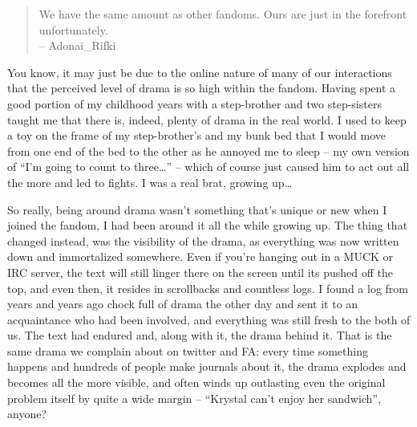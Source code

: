 \begin{quote}
We have the same amount as other fandoms. Ours are just in the forefront unfortunately.\\
-- Adonai\_Rifki
\end{quote}

You know, it may just be due to the online nature of many of our interactions that the perceived level of drama is so high within the fandom. Having spent a good portion of my childhood years with a step-brother and two step-sisters taught me that there is, indeed, plenty of drama in the real world. I used to keep a toy on the frame of my step-brother's and my bunk bed that I would move from one end of the bed to the other as he annoyed me to sleep -- my own version of ``I'm going to count to three\ldots'' -- which of course just caused him to act out all the more and led to fights. I was a real brat, growing up…

So really, being around drama wasn't something that's unique or new when I joined the fandom, I had been around it all the while growing up. The thing that changed instead, was the visibility of the drama, as everything was now written down and immortalized somewhere. Even if you're hanging out in a MUCK or IRC server, the text will still linger there on the screen until its pushed off the top, and even then, it resides in scrollbacks and countless logs. I found a log from years and years ago chock full of drama the other day and sent it to an acquaintance who had been involved, and everything was still fresh to the both of us. The text had endured and, along with it, the drama behind it. That is the same drama we complain about on twitter and FA: every time something happens and hundreds of people make journals about it, the drama explodes and becomes all the more visible, and often winds up outlasting even the original problem itself by quite a wide margin -- ``Krystal can't enjoy her sandwich'', anyone?
